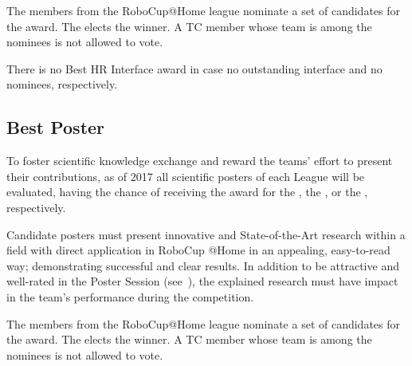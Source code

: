 The  members from the RoboCup@Home league nominate a set of candidates for the award. The  elects the winner. A TC member whose team is among the nominees is not allowed to vote.

There is no Best HR Interface award in case no outstanding interface and no nominees, respectively.

\subsection{Best Poster}
\label{award:poster}
To foster scientific knowledge exchange and reward the teams' effort to present their contributions, as of 2017 all scientific posters of each League will be evaluated, having the chance of receiving the award for the , the , or the , respectively.

Candidate posters must present innovative and State-of-the-Art research within a field with direct application in RoboCup @Home in an appealing, easy-to-read way; demonstrating successful and clear results. In addition to be attractive and well-rated in the Poster Session (see~), the explained research must have impact in the team's performance during the competition.

The  members from the RoboCup@Home league nominate a set of candidates for the award. The  elects the winner. A TC member whose team is among the nominees is not allowed to vote.

%
%
%

